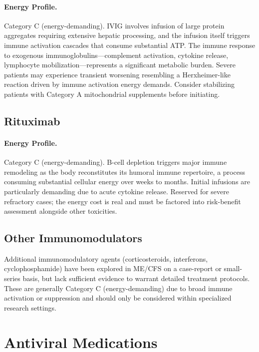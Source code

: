 \paragraph{Energy Profile.}
Category C (energy-demanding). IVIG involves infusion of large protein aggregates requiring extensive hepatic processing, and the infusion itself triggers immune activation cascades that consume substantial ATP. The immune response to exogenous immunoglobulins---complement activation, cytokine release, lymphocyte mobilization---represents a significant metabolic burden. Severe patients may experience transient worsening resembling a Herxheimer-like reaction driven by immune activation energy demands. Consider stabilizing patients with Category A mitochondrial supplements before initiating.

\subsection{Rituximab}

\paragraph{Energy Profile.}
Category C (energy-demanding). B-cell depletion triggers major immune remodeling as the body reconstitutes its humoral immune repertoire, a process consuming substantial cellular energy over weeks to months. Initial infusions are particularly demanding due to acute cytokine release. Reserved for severe refractory cases; the energy cost is real and must be factored into risk-benefit assessment alongside other toxicities.

\subsection{Other Immunomodulators}

Additional immunomodulatory agents (corticosteroids, interferons, cyclophosphamide) have been explored in ME/CFS on a case-report or small-series basis, but lack sufficient evidence to warrant detailed treatment protocols. These are generally Category C (energy-demanding) due to broad immune activation or suppression and should only be considered within specialized research settings.

\section{Antiviral Medications}
\label{sec:antivirals}

